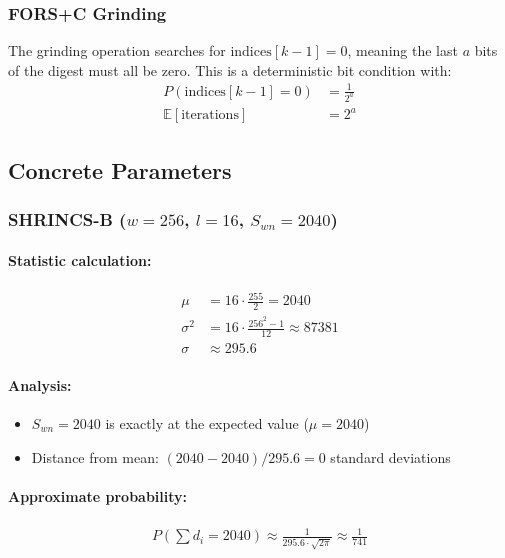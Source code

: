 \subsubsection{FORS+C Grinding}
The grinding operation searches for $\text{indices}[k-1] = 0$, meaning the last $a$ bits of the digest must all be zero. This is a deterministic bit condition with:
\begin{align}
    P(\text{indices}[k-1] = 0) &= \frac{1}{2^a} \\
    \mathbb{E}[\text{iterations}] &= 2^a
\end{align}

\subsection{Concrete Parameters}

\subsubsection{SHRINCS-B ($w=256$, $l=16$, $S_{wn}=2040$)}
\paragraph{Statistic calculation:}
\begin{align}
    \mu &= 16 \cdot \frac{255}{2} = 2040 \\
    \sigma^2 &= 16 \cdot \frac{256^2-1}{12} \approx 87381 \\
    \sigma &\approx 295.6
\end{align}

\paragraph{Analysis:}
\begin{itemize}
    \item $S_{wn} = 2040$ is exactly at the expected value ($\mu = 2040$)
    \item Distance from mean: $(2040 - 2040)/295.6 = 0$ standard deviations
\end{itemize}

\paragraph{Approximate probability:}
\begin{align}
    P(\sum d_i = 2040) \approx \frac{1}{295.6 \cdot \sqrt{2\pi}} \approx \frac{1}{741}
\end{align}

